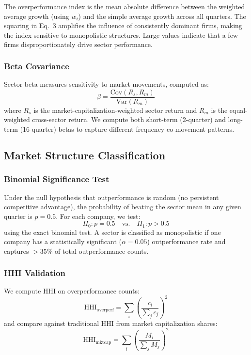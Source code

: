 \documentclass[11pt]{article}
\begin{document}
The overperformance index is the mean absolute difference between the weighted average growth (using $w_i$) and the simple average growth across all quarters. The squaring in Eq.~3 amplifies the influence of consistently dominant firms, making the index sensitive to monopolistic structures. Large values indicate that a few firms disproportionately drive sector performance.

\subsubsection{Beta Covariance}
Sector beta measures sensitivity to market movements, computed as:
\begin{equation}
    \beta = \frac{\text{Cov}(R_s, R_m)}{\text{Var}(R_m)}
\end{equation}
where $R_s$ is the market-capitalization-weighted sector return and $R_m$ is the equal-weighted cross-sector return. We compute both short-term (2-quarter) and long-term (16-quarter) betas to capture different frequency co-movement patterns.

\subsection{Market Structure Classification}

\subsubsection{Binomial Significance Test}
Under the null hypothesis that outperformance is random (no persistent competitive advantage), the probability of beating the sector mean in any given quarter is $p = 0.5$. For each company, we test:
\begin{equation}
    H_0: p = 0.5 \quad \text{vs.} \quad H_1: p > 0.5
\end{equation}
using the exact binomial test. A sector is classified as monopolistic if one company has a statistically significant ($\alpha = 0.05$) outperformance rate and captures $>35\%$ of total outperformance counts.

\subsubsection{HHI Validation}
We compute HHI on overperformance counts:
\begin{equation}
    \text{HHI}_{\text{overperf}} = \sum_i \left(\frac{c_i}{\sum_j c_j}\right)^2
\end{equation}
and compare against traditional HHI from market capitalization shares:
\begin{equation}
    \text{HHI}_{\text{mktcap}} = \sum_i \left(\frac{M_i}{\sum_j M_j}\right)^2
\end{equation}
\end{document}
